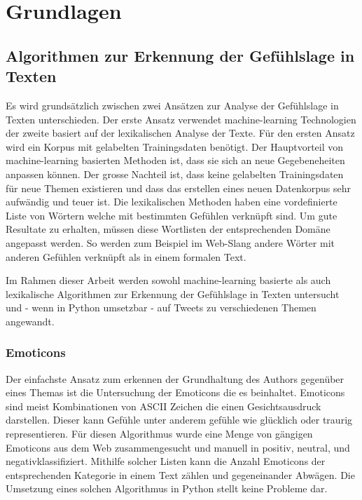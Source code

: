 \clearpage
\section{Grundlagen}
\subsection{Algorithmen zur Erkennung der Gefühlslage in Texten}
Es wird grundsätzlich zwischen zwei Ansätzen zur Analyse der Gefühlslage in Texten unterschieden. Der erste Ansatz verwendet machine-learning Technologien der zweite basiert auf der lexikalischen Analyse der Texte. Für den ersten Ansatz wird ein Korpus mit gelabelten Trainingsdaten benötigt. \cite{thumbs_up} Der Hauptvorteil von machine-learning basierten Methoden ist, dass sie sich an neue Gegebeneheiten anpassen können. Der grosse Nachteil ist, dass keine gelabelten Trainingsdaten für neue Themen existieren und dass das erstellen eines neuen Datenkorpus sehr aufwändig und teuer ist. Die lexikalischen Methoden haben eine vordefinierte Liste von Wörtern welche mit bestimmten Gefühlen verknüpft sind. Um gute Resultate zu erhalten, müssen diese Wortlisten der entsprechenden Domäne angepasst werden. So werden zum Beispiel im Web-Slang andere Wörter mit anderen Gefühlen verknüpft als in einem formalen Text. \cite{comparing}

Im Rahmen dieser Arbeit werden sowohl machine-learning basierte als auch lexikalische Algorithmen zur Erkennung der Gefühlslage in Texten untersucht und - wenn in Python umsetzbar - auf Tweets zu verschiedenen Themen angewandt.

\subsubsection{Emoticons}
Der einfachste Ansatz zum erkennen der Grundhaltung des Authors gegenüber eines Themas ist die Untersuchung der Emoticons die es beinhaltet. Emoticons sind meist Kombinationen von ASCII Zeichen die einen Gesichtsausdruck darstellen. Dieser kann Gefühle unter anderem gefühle wie glücklich oder traurig representieren. Für diesen Algorithmus wurde eine Menge von gängigen Emoticons aus dem Web \cite{emoticons1}\cite{emoticons2}\cite{emoticons3} zusammengesucht und manuell in \flqq positiv\frqq, \flqq neutral\frqq, und \flqq negativ\frqq klassifiziert. Mithilfe solcher Listen kann die Anzahl Emoticons der entsprechenden Kategorie in einem Text zählen und gegeneinander Abwägen. \cite{comparing} Die Umsetzung eines solchen Algorithmus in Python stellt keine Probleme dar.

